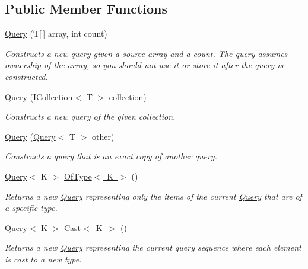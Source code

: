 \subsection*{Public Member Functions}
\begin{DoxyCompactItemize}
\item 
\mbox{\hyperlink{struct_leap_1_1_unity_1_1_query_1_1_query_a045e15022385ac33bf7ea2448de59f93}{Query}} (T\mbox{[}$\,$\mbox{]} array, int count)
\begin{DoxyCompactList}\small\item\em Constructs a new query given a source array and a count. The query assumes ownership of the array, so you should not use it or store it after the query is constructed. \end{DoxyCompactList}\item 
\mbox{\hyperlink{struct_leap_1_1_unity_1_1_query_1_1_query_a38ad1df9355f871cde35fe9ca7c72da0}{Query}} (I\+Collection$<$ T $>$ collection)
\begin{DoxyCompactList}\small\item\em Constructs a new query of the given collection. \end{DoxyCompactList}\item 
\mbox{\hyperlink{struct_leap_1_1_unity_1_1_query_1_1_query_a023addd104eccd2f92b37e67eb84208f}{Query}} (\mbox{\hyperlink{struct_leap_1_1_unity_1_1_query_1_1_query}{Query}}$<$ T $>$ other)
\begin{DoxyCompactList}\small\item\em Constructs a query that is an exact copy of another query. \end{DoxyCompactList}\item 
\mbox{\hyperlink{struct_leap_1_1_unity_1_1_query_1_1_query}{Query}}$<$ K $>$ \mbox{\hyperlink{struct_leap_1_1_unity_1_1_query_1_1_query_a88411752d9806dc0364de025ac9b53b9}{Of\+Type$<$ K $>$}} ()
\begin{DoxyCompactList}\small\item\em Returns a new \mbox{\hyperlink{struct_leap_1_1_unity_1_1_query_1_1_query}{Query}} representing only the items of the current \mbox{\hyperlink{struct_leap_1_1_unity_1_1_query_1_1_query}{Query}} that are of a specific type. \end{DoxyCompactList}\item 
\mbox{\hyperlink{struct_leap_1_1_unity_1_1_query_1_1_query}{Query}}$<$ K $>$ \mbox{\hyperlink{struct_leap_1_1_unity_1_1_query_1_1_query_a907b194ea3d1901191343fa409ca6c42}{Cast$<$ K $>$}} ()
\begin{DoxyCompactList}\small\item\em Returns a new \mbox{\hyperlink{struct_leap_1_1_unity_1_1_query_1_1_query}{Query}} representing the current query sequence where each element is cast to a new type. \end{DoxyCompactList}\item 

\end{DoxyCompactItemize}
